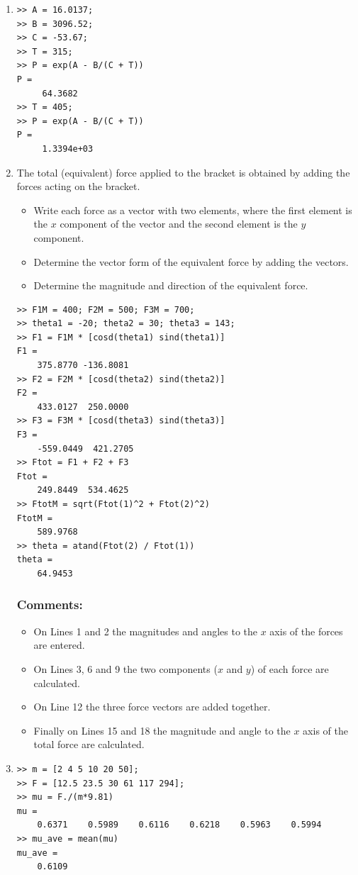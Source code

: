 \begin{enumerate}
\item
\begin{lstlisting}
>> A = 16.0137;
>> B = 3096.52;
>> C = -53.67;
>> T = 315;
>> P = exp(A - B/(C + T))
P = 
	 64.3682
>> T = 405;
>> P = exp(A - B/(C + T))
P = 
	 1.3394e+03
\end{lstlisting}

\clearpage
\item
The total (equivalent) force applied to the bracket is obtained by adding the forces acting on the bracket.
\begin{itemize}
\item Write each force as a vector with two elements, where the first element is the $x$ component of the vector and the second element is the $y$ component.
\item Determine the vector form of the equivalent force by adding the vectors.
\item Determine the magnitude and direction of the equivalent force.
\end{itemize}
\begin{lstlisting}
>> F1M = 400; F2M = 500; F3M = 700;
>> theta1 = -20; theta2 = 30; theta3 = 143;
>> F1 = F1M * [cosd(theta1) sind(theta1)]
F1 =
    375.8770 -136.8081
>> F2 = F2M * [cosd(theta2) sind(theta2)]
F2 =
    433.0127  250.0000
>> F3 = F3M * [cosd(theta3) sind(theta3)]
F3 =
    -559.0449  421.2705
>> Ftot = F1 + F2 + F3
Ftot =
    249.8449  534.4625
>> FtotM = sqrt(Ftot(1)^2 + Ftot(2)^2)
FtotM =
    589.9768
>> theta = atand(Ftot(2) / Ftot(1))
theta =
    64.9453
\end{lstlisting}
\subsubsection{Comments:}
\begin{itemize}
\item On Lines 1 and 2 the magnitudes and angles to the $x$ axis of the forces are entered.
\item On Lines 3, 6 and 9 the two components ($x$ and $y$) of each force are calculated.
\item On Line 12 the three force vectors are added together.
\item Finally on Lines 15 and 18 the magnitude and angle to the $x$ axis of the total force are calculated.
\end{itemize}

\clearpage
\item
\begin{lstlisting}
>> m = [2 4 5 10 20 50];
>> F = [12.5 23.5 30 61 117 294];
>> mu = F./(m*9.81)
mu =
    0.6371    0.5989    0.6116    0.6218    0.5963    0.5994
>> mu_ave = mean(mu)
mu_ave =
    0.6109
\end{lstlisting}

\end{enumerate}
